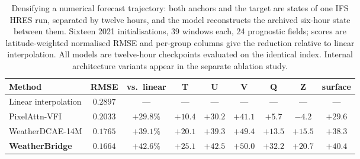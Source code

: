 \begin{table}[!htbp]
\centering
\caption{Densifying a numerical forecast trajectory: both anchors and the target
are states of one IFS HRES run, separated by twelve hours, and the model
reconstructs the archived six-hour state between them. Sixteen 2021
initialisations, 39 windows each, 24 prognostic fields; scores are
latitude-weighted normalised RMSE and per-group columns give the reduction
relative to linear interpolation. All models are twelve-hour checkpoints
evaluated on the identical index. Internal architecture variants appear in the
separate ablation study.}
\label{tab:hres-same-trajectory}
\small
\setlength{\tabcolsep}{4pt}
\begin{tabular}{lcccccccc}
\toprule
Method & RMSE & vs.\ linear & T & U & V & Q & Z & surface \\
\midrule
Linear interpolation   & $0.2897$          & ---                & ---     & ---     & ---     & ---     & ---     & ---     \\
PixelAttn-VFI          & $0.2033$          & $+29.8\%$          & $+10.4$ & $+30.2$ & $+41.1$ & $+5.7$  & $-4.2$  & $+29.6$ \\
WeatherDCAE-14M        & $0.1765$          & $+39.1\%$          & $+20.1$ & $+39.3$ & $+49.4$ & $+13.5$ & $+15.5$ & $+38.3$ \\
\textbf{WeatherBridge} & $\mathbf{0.1664}$ & $\mathbf{+42.6\%}$ & $+25.1$ & $+42.5$ & $+50.0$ & $+32.2$ & $+20.7$ & $+40.4$ \\
\bottomrule
\end{tabular}
\end{table}
